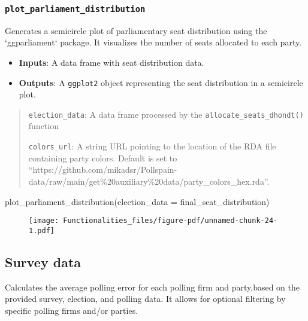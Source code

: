 \documentclass[
  letterpaper,
  DIV=11,
  numbers=noendperiod]{scrreprt}
\newenvironment{Shaded}{\begin{snugshade}}{\end{snugshade}}
\newcommand{\AttributeTok}[1]{\textcolor[rgb]{0.40,0.45,0.13}{#1}}
\newcommand{\FunctionTok}[1]{\textcolor[rgb]{0.28,0.35,0.67}{#1}}
\newcommand{\NormalTok}[1]{\textcolor[rgb]{0.00,0.23,0.31}{#1}}
\providecommand{\tightlist}{%
  \setlength{\itemsep}{0pt}\setlength{\parskip}{0pt}}\usepackage{longtable,booktabs,array}
\begin{document}
\hypertarget{plot_parliament_distribution}{%
\subsubsection{\texorpdfstring{\texttt{plot\_parliament\_distribution}}{plot\_parliament\_distribution}}\label{plot_parliament_distribution}}

Generates a semicircle plot of parliamentary seat distribution using the
`ggparliament` package. It visualizes the number of seats allocated to
each party.

\begin{itemize}
\tightlist
\item
  \textbf{Inputs}: A data frame with seat distribution data.
\item
  \textbf{Outputs}: A \texttt{ggplot2} object representing the seat
  distribution in a semicircle plot.
\end{itemize}

\begin{quote}
\texttt{election\_data}: A data frame processed by the
\texttt{allocate\_seats\_dhondt()} function

\texttt{colors\_url}: A string URL pointing to the location of the RDA
file containing party colors. Default is set to
``https://github.com/mikadsr/Pollspain-data/raw/main/get\%20auxiliary\%20data/party\_colors\_hex.rda''.
\end{quote}

\begin{Shaded}
\begin{Highlighting}[]
\FunctionTok{plot\_parliament\_distribution}\NormalTok{(}\AttributeTok{election\_data =}\NormalTok{ final\_seat\_distribution)}
\end{Highlighting}
\end{Shaded}

\begin{figure}[H]

{\centering \texttt{[image: Functionalities\_files/figure-pdf/unnamed-chunk-24-1.pdf]}

}

\end{figure}

\hypertarget{survey-data-1}{%
\subsection{Survey data}\label{survey-data-1}}

Calculates the average polling error for each polling firm and
party,based on the provided survey, election, and polling data. It
allows for optional filtering by specific polling firms and/or parties.
\end{document}

